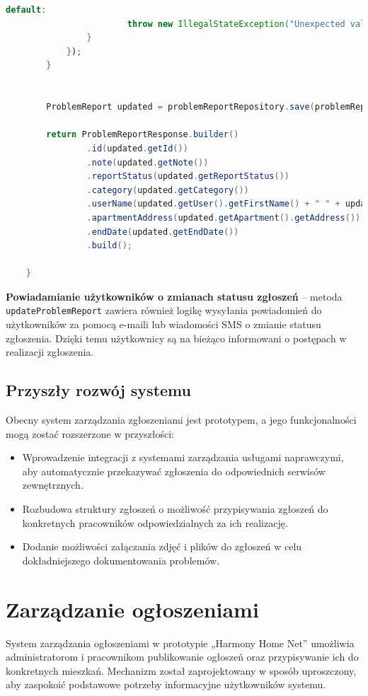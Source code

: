 \begin{lstlisting}[language=Java, caption=Aktualizacja zgłoszenia problemu.]
                    default:
                        throw new IllegalStateException("Unexpected value: " + notificationType.getType());
                }
            });
        }


        ProblemReport updated = problemReportRepository.save(problemReportToUpdate);

        return ProblemReportResponse.builder()
                .id(updated.getId())
                .note(updated.getNote())
                .reportStatus(updated.getReportStatus())
                .category(updated.getCategory())
                .userName(updated.getUser().getFirstName() + " " + updated.getUser().getLastName())
                .apartmentAddress(updated.getApartment().getAddress())
                .endDate(updated.getEndDate())
                .build();

    }
\end{lstlisting}

\textbf{Powiadamianie użytkowników o zmianach statusu zgłoszeń} -- metoda \texttt{updateProblemReport} zawiera również logikę wysyłania powiadomień do użytkowników za pomocą e-maili lub wiadomości SMS o zmianie statusu zgłoszenia. Dzięki temu użytkownicy są na bieżąco informowani o postępach w realizacji zgłoszenia.

\subsection{Przyszły rozwój systemu}
Obecny system zarządzania zgłoszeniami jest prototypem, a jego funkcjonalności mogą zostać rozszerzone w przyszłości:
\begin{itemize}
    \item Wprowadzenie integracji z systemami zarządzania usługami naprawczymi, aby automatycznie przekazywać zgłoszenia do odpowiednich serwisów zewnętrznych.
    \item Rozbudowa struktury zgłoszeń o możliwość przypisywania zgłoszeń do konkretnych pracowników odpowiedzialnych za ich realizację.
    \item Dodanie możliwości załączania zdjęć i plików do zgłoszeń w celu dokładniejszego dokumentowania problemów.
\end{itemize}


\section{Zarządzanie ogłoszeniami}

System zarządzania ogłoszeniami w prototypie „Harmony Home Net” umożliwia administratorom i pracownikom publikowanie ogłoszeń oraz przypisywanie ich do konkretnych mieszkań. Mechanizm został zaprojektowany w sposób uproszczony, aby zaspokoić podstawowe potrzeby informacyjne użytkowników systemu.

